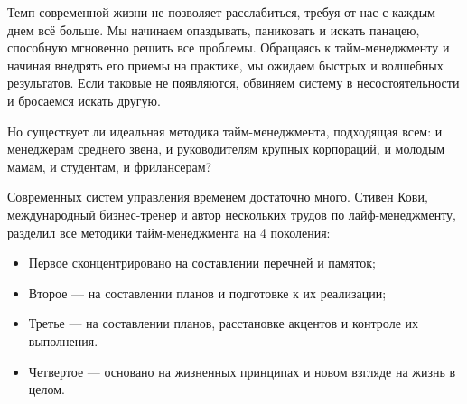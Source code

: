 \label{sec:intro}

Темп современной жизни не позволяет расслабиться, требуя от нас с каждым днем всё больше. Мы начинаем опаздывать, паниковать и искать панацею, способную мгновенно решить все проблемы. Обращаясь к тайм-менеджменту и начиная внедрять его приемы на практике, мы ожидаем быстрых и волшебных результатов. Если таковые не появляются, обвиняем систему в несостоятельности и бросаемся искать другую.


Но существует ли идеальная методика тайм-менеджмента, подходящая всем: и менеджерам среднего звена, и руководителям крупных корпораций, и молодым мамам, и студентам, и фрилансерам?

Современных систем управления временем достаточно много. Стивен Кови, международный бизнес-тренер и автор нескольких трудов по лайф-менеджменту, разделил все методики тайм-менеджмента на 4 поколения:

\begin{itemize}
	\item Первое сконцентрировано на составлении перечней и памяток;
	\item Второе — на составлении планов и подготовке к их реализации;
	\item Третье — на составлении планов, расстановке акцентов и контроле их выполнения.
	\item Четвертое — основано на жизненных принципах и новом взгляде на жизнь в целом.
\end{itemize}


